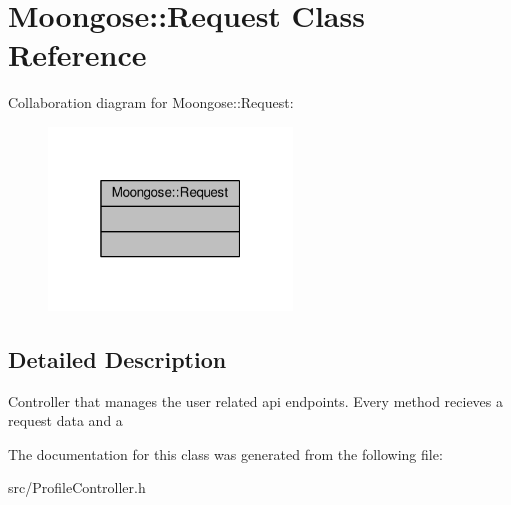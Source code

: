 \hypertarget{classMoongose_1_1Request}{}\section{Moongose\+:\+:Request Class Reference}
\label{classMoongose_1_1Request}


Collaboration diagram for Moongose\+:\+:Request\+:
\nopagebreak
\begin{figure}[H]
\begin{center}
\leavevmode
\includegraphics[width=184pt]{d8/d19/classMoongose_1_1Request__coll__graph}
\end{center}
\end{figure}


\subsection{Detailed Description}
Controller that manages the user related api endpoints. Every method recieves a request data and a 

The documentation for this class was generated from the following file\+:\begin{DoxyCompactItemize}
\item 
src/Profile\+Controller.\+h\end{DoxyCompactItemize}
